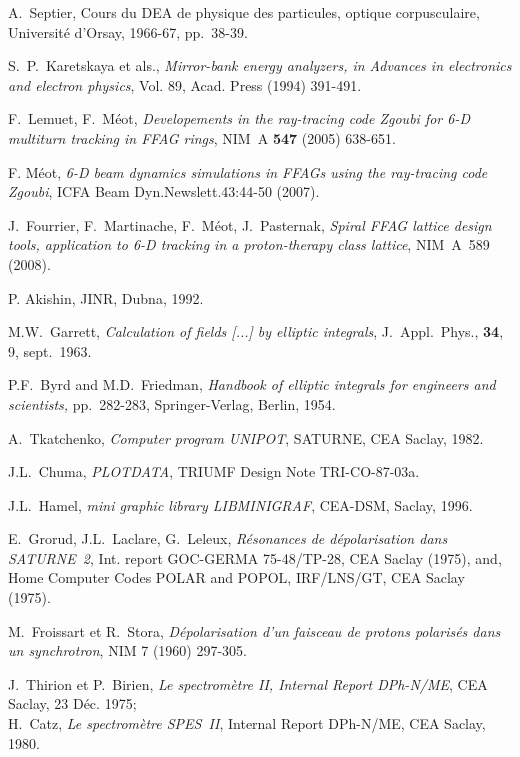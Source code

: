 \begin{thebibliography}{99}
 A.~Septier, Cours du DEA de physique des
particules, optique corpusculaire, Universit\'e d'Orsay, 1966-67, pp.~38-39.  


\newpage

 S.~P.~Karetskaya et als., 
\textsl{Mirror-bank energy analyzers, in Advances in electronics and electron physics}, 
Vol. 89, Acad. Press (1994) 391-491. 

 F.~Lemuet, F.~M\'eot, \textsl{Developements in the ray-tracing code Zgoubi for 
6-D multiturn tracking in FFAG rings}, NIM~A \textbf{547} (2005) 638-651. 

 F. M\'eot,  
\textsl{6-D beam dynamics simulations in FFAGs using the ray-tracing code Zgoubi}, 
ICFA Beam Dyn.Newslett.43:44-50 (2007).

 J.~Fourrier, F.~Martinache, F.~M\'eot, J.~Pasternak, 
\textsl{Spiral FFAG lattice design tools,  application to 6-D tracking in a proton-therapy class lattice}, 
NIM~A~589 (2008). 

 P. Akishin, JINR, Dubna, 1992.

 M.W.~Garrett, \textsl{Calculation of
fields  [...] by elliptic integrals}, J.~Appl.~Phys., \textbf{34}, 9, sept.~1963.  

 P.F.~Byrd and M.D.~Friedman, \textsl{Handbook of elliptic integrals 
for engineers and scientists,} pp.~282-283, Springer-Verlag, Berlin, 1954.  

 A.~Tkatchenko, \textsl{Computer program UNIPOT}, SATURNE, CEA Saclay, 1982. 

 J.L.~Chuma, \textsl{PLOTDATA}, TRIUMF Design Note TRI-CO-87-03a.

 J.L.~Hamel, \textsl{mini graphic library LIBMINIGRAF}, CEA-DSM, Saclay, 1996.

 E.~Grorud, J.L.~Laclare, G.~Leleux, 
\textsl{R\'esonances de d\'epolarisation dans SATURNE~2}, 
Int. report GOC-GERMA 75-48/TP-28, CEA Saclay (1975), 
and, Home Computer Codes POLAR and POPOL, IRF/LNS/GT, CEA Saclay (1975).

 M.~Froissart et R.~Stora, 
\textsl{D\'epolarisation d'un faisceau de protons polaris\'es dans un synchrotron},
 NIM 7 (1960) 297-305.

 J.~Thirion et P.~Birien, 
\textsl{Le spectrom\`etre II, Internal Report DPh-N/ME}, 
CEA Saclay, 23 D\'ec. 1975; \\
H.~Catz, \textsl{Le spectrom\`etre SPES~II}, Internal Report DPh-N/ME, CEA Saclay, 1980. 


\end{thebibliography}
